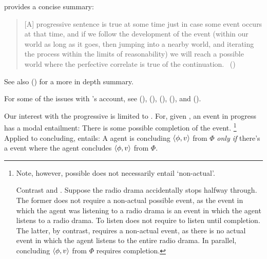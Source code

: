 \begin{note}
{    \textcite{Szabo:2004ul} provides a concise summary:
    \begin{quote}
      [A] progressive sentence is true at some time just in case some event occurs at that time, and if we follow the development of the event (within our world as long as it goes, then jumping into a nearby world, and iterating the process within the limits of reasonability) we will reach a possible world where the perfective correlate is true of the continuation.%
      \mbox{ }\hfill\mbox{(\citeyear[34]{Szabo:2004ul})}
    \end{quote}
    See also (\cite[764--766]{Portner:1998um}) for a more in depth summary.

    For some of the issues with \citeauthor{Landman:1992wh}'s account, see (\cite{Bonomi:1997uq}), (\cite[49--50]{Engelberg:1999vi}), (\cite[35]{Szabo:2004ul}), (\cite[767]{Portner:1998um}), and (\cite[esp.][1256]{Portner:2011vi}).
  }
  Our interest with the progressive is limited to \assuPP{}.
  For, given \assuPP{}, an event in progress has a modal entailment:
  There is some possible completion of the event.%
  \footnote{
    Note, however, possible does not necessarily entail `non-actual'.

    Contrast  and .
    Suppose the radio drama accidentally stops halfway through.
    The former does not require a non-actual possible event, as the event in which the agent was listening to a radio drama is an event in which the agent listens to a radio drama.
    To listen does not require to listen until completion.
    The latter, by contrast, requires a non-actual event, as there is no actual event in which the agent listens to the entire radio drama.
    In parallel, concluding \(\langle \phi, v \rangle\) from \(\Phi\) requires completion.
  }
  Applied to concluding, \assuPP{} entails:
  A agent is concluding \(\langle \phi, v \rangle\) from \(\Phi\) \emph{only if} there's a  event where the agent concludes \(\langle \phi, v \rangle\) from \(\Phi\).
\end{note}

